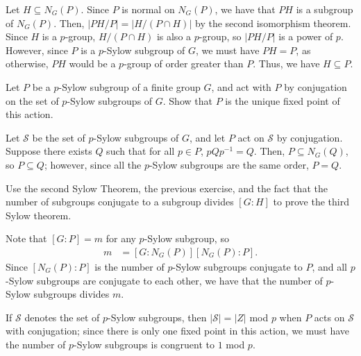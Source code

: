 \documentclass[10pt]{mypackage}
\begin{document}
\begin{solution}
  Let $H\subseteq N_G(P)$. Since $P$ is normal on $N_G(P)$, we have that $PH$ is a subgroup of $N_G(P)$. Then, $\left\vert PH/P \right\vert = \left\vert H/\left( P\cap H \right) \right\vert$ by the second isomorphism theorem. Since $H$ is a $p$-group, $H/\left( P\cap H \right)$ is also a $p$-group, so $\left\vert PH/P \right\vert$ is a power of $p$. However, since $P$ is a $p$-Sylow subgroup of $G$, we must have $PH = P$, as otherwise, $PH$ would be a $p$-group of order greater than $P$. Thus, we have $H\subseteq P$.
\end{solution}
\begin{exercise}
  Let $P$ be a $p$-Sylow subgroup of a finite group $G$, and act with $P$ by conjugation on the set of $p$-Sylow subgroups of $G$. Show that $P$ is the unique fixed point of this action.
\end{exercise}
\begin{solution}
  Let $\mathcal{S}$ be the set of $p$-Sylow subgroups of $G$, and let $P$ act on $\mathcal{S}$ by conjugation. Suppose there exists $Q$ such that for all $p\in P$, $pQp^{-1} = Q$. Then, $P\subseteq N_{G}\left( Q \right)$, so $P\subseteq Q$; however, since all the $p$-Sylow subgroups are the same order, $P = Q$.
\end{solution}
\begin{exercise}
  Use the second Sylow Theorem, the previous exercise, and the fact that the number of subgroups conjugate to a subgroup divides $\left[ G:H \right]$ to prove the third Sylow theorem.
\end{exercise}
\begin{solution}
  Note that $\left[ G:P \right] = m$ for any $p$-Sylow subgroup, so
  \begin{align*}
    m &= \left[ G:N_G(P) \right]\left[ N_G(P):P \right].
  \end{align*}
  Since $\left[ N_G(P):P \right]$ is the number of $p$-Sylow subgroups conjugate to $P$, and all $p$-Sylow subgroups are conjugate to each other, we have that the number of $p$-Sylow subgroups divides $m$.\newline

  If $\mathcal{S}$ denotes the set of $p$-Sylow subgroups, then $\left\vert \mathcal{S} \right\vert = \left\vert Z \right\vert $ mod $p$ when $P$ acts on $\mathcal{S}$ with conjugation; since there is only one fixed point in this action, we must have the number of $p$-Sylow subgroups is congruent to $1$ mod $p$.
\end{solution}
\end{document}

